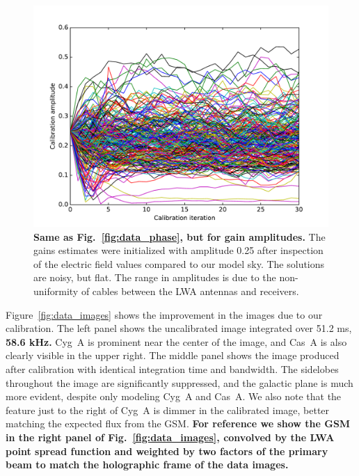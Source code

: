 \documentclass[a4paper,fleqn,usenatbib]{../mnras}
\begin{document}
\begin{figure}
\begin{center}
\includegraphics[width=\columnwidth]{fig8.pdf}
\caption{\textbf{Same as Fig.~\ref{fig:data_phase}, but for gain amplitudes.}
The 
gains estimates were initialized with amplitude 0.25 after inspection of the electric field values 
compared to our model sky. The solutions are noisy, but flat. The range in amplitudes is due to 
the non-uniformity of cables between the LWA antennas and receivers.
}
\label{fig:data_amp}
\end{center}
\end{figure}

Figure~\ref{fig:data_images} shows the improvement in the images due to our calibration. The 
left panel shows the uncalibrated image integrated over 51.2 ms, \textbf{58.6 kHz.} Cyg~A is prominent 
near the center of the image, and Cas~A is also clearly visible in the upper right. The middle 
panel shows the image produced after calibration with identical integration time and bandwidth. 
The sidelobes throughout the image are significantly suppressed, and the galactic plane is 
much more evident, despite only modeling Cyg~A and Cas~A. We also note that the feature 
just to the right of Cyg~A is dimmer in the calibrated image, better matching the expected flux 
from the GSM. 
\textbf{For reference we show the GSM in the right panel of 
Fig.~\ref{fig:data_images}, convolved by the LWA point spread function and weighted
by  two factors of the primary beam to match the holographic frame of the data images.}
\end{document}
